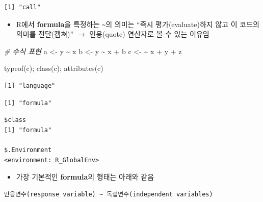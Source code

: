 \documentclass[
  11pt,
]{krantz}
\newenvironment{Shaded}{\begin{snugshade}}{\end{snugshade}}
\newcommand{\CommentTok}[1]{\textcolor[rgb]{0.37,0.37,0.37}{\textit{#1}}}
\newcommand{\ErrorTok}[1]{\textcolor[rgb]{0.14,0.14,0.14}{\textbf{#1}}}
\newcommand{\FunctionTok}[1]{\textcolor[rgb]{0,0,0}{#1}}
\newcommand{\NormalTok}[1]{#1}
\newcommand{\OtherTok}[1]{\textcolor[rgb]{0.37,0.37,0.37}{#1}}
\newcommand{\SpecialCharTok}[1]{\textcolor[rgb]{0,0,0}{#1}}
\providecommand{\tightlist}{%
  \setlength{\itemsep}{0pt}\setlength{\parskip}{0pt}}
\begin{document}
\begin{verbatim}
[1] "call"
\end{verbatim}

\normalsize

\begin{itemize}
\tightlist
\item
  R에서 \textbf{formula}을 특정하는 \texttt{\textasciitilde{}}의 의미는 ``즉시 평가(evaluate)하지 않고 이 코드의 의미를 전달(캡쳐)'' \(\rightarrow\) 인용(quote) 연산자로 볼 수 있는 이유임
\end{itemize}

\footnotesize

\begin{Shaded}
\begin{Highlighting}[]
\CommentTok{\# 수식 표현}
\NormalTok{a }\OtherTok{\textless{}{-}}\NormalTok{ y }\SpecialCharTok{\textasciitilde{}}\NormalTok{ x}
\NormalTok{b }\OtherTok{\textless{}{-}}\NormalTok{ y }\SpecialCharTok{\textasciitilde{}}\NormalTok{ x }\SpecialCharTok{+}\NormalTok{ b}
\NormalTok{c }\OtherTok{\textless{}{-}} \ErrorTok{\textasciitilde{}}\NormalTok{ x }\SpecialCharTok{+}\NormalTok{ y }\SpecialCharTok{+}\NormalTok{ z}

\FunctionTok{typeof}\NormalTok{(c); }\FunctionTok{class}\NormalTok{(c); }\FunctionTok{attributes}\NormalTok{(c)}
\end{Highlighting}
\end{Shaded}

\begin{verbatim}
[1] "language"
\end{verbatim}

\begin{verbatim}
[1] "formula"
\end{verbatim}

\begin{verbatim}
$class
[1] "formula"

$.Environment
<environment: R_GlobalEnv>
\end{verbatim}

\normalsize

\begin{itemize}
\tightlist
\item
  가장 기본적인 \textbf{formula}의 형태는 아래와 같음
\end{itemize}

\begin{verbatim}
반응변수(response variable) ~ 독립변수(independent variables)
\end{verbatim}
\end{document}

